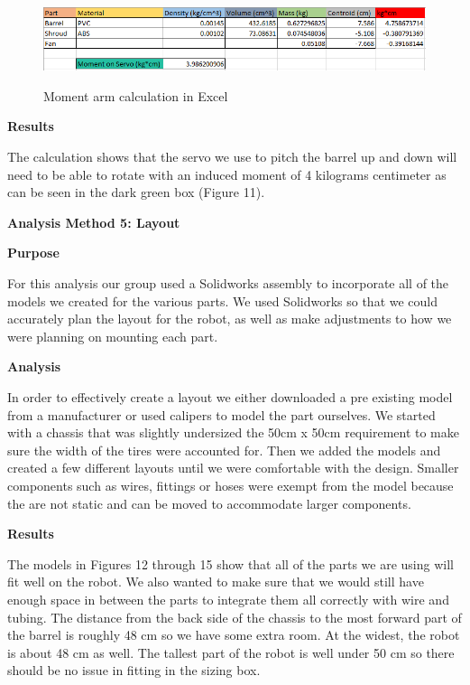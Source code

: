 \documentclass[12pt,letterpaper,titlepage]{article}
\begin{document}
\begin{figure}[H]
	\centering
	\includegraphics[width=\textwidth]{images/MomentServo}
	\label{fig:MomentServo}
	\caption{Moment arm calculation in Excel}
\end{figure}

\smallskip\noindent\textbf{Results}

The calculation shows that the servo we use to pitch the barrel up and down will need to be able to rotate with an induced moment of 4 kilograms centimeter as can be seen in the dark green box (Figure 11).

\bigskip\noindent\textbf{Analysis Method 5: Layout}

\medskip\noindent\textbf{Purpose}

For this analysis our group used a Solidworks assembly to incorporate all of the models we created for the various parts. We used Solidworks so that we could accurately plan the layout for the robot, as well as make adjustments to how we were planning on mounting each part.

\smallskip\noindent\textbf{Analysis}

In order to effectively create a layout we either downloaded a pre existing model from a manufacturer or used calipers to model the part ourselves. We started with a chassis that was slightly undersized the 50cm x 50cm requirement to make sure the width of the tires were accounted for. Then we added the models and created a few different layouts until we were comfortable with the design. Smaller components such as wires, fittings or hoses were exempt from the model because the are not static and can be moved to accommodate larger components.  

\smallskip\noindent\textbf{Results}

The models in Figures 12 through 15 show that all of the parts we are using will fit well on the robot. We also wanted to make sure that we would still have enough space in between the parts to integrate them all correctly with wire and tubing. The distance from the back side of the chassis to the most forward part of the barrel is roughly 48 cm so we have some extra room. At the widest, the robot is about 48 cm as well. The tallest part of the robot is well under 50 cm so there should be no issue in fitting in the sizing box. 
\end{document}
